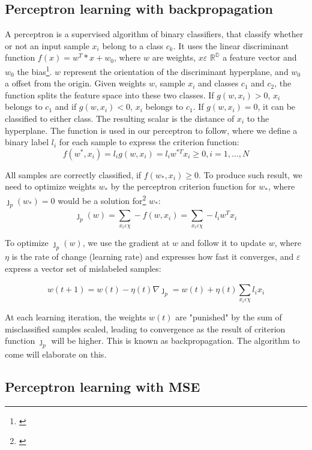 \documentclass[journal]{IEEEtran}
\begin{document}
\subsection{Perceptron learning with backpropagation}

A perceptron is a supervised algorithm of binary classifiers, that classify whether or not an input sample $x_{i}$ belong to a class $c_{k}$. It uses the linear discriminant function $f(x) = w^T*x + w_{0}$, where $w$ are weights, $x\varepsilon$ $\mathbb{R^D}$ a feature vector and $w_{0}$ the bias\footnote{\cite{Iosifidis2017}}. $w$ represent the orientation of the discriminant hyperplane, and $w_{0}$ a offset from the origin. Given weights $w$, sample $x_{i}$ and classes $c_{1}$ and $c_{2}$, the function splits the feature space into these two classes. If $g(w,x_{i}) > 0$, $x_{i}$ belongs to $c_{1}$ and if $g(w,x_{i}) < 0$, $x_{i}$ belongs to $c_{1}$. If $g(w,x_{i}) = 0$, it can be classified to either class. The resulting scalar is the distance of $x_{i}$ to the hyperplane. The function is used in our perceptron to follow, where we define a binary label $l_{i}$ for each sample to express the criterion function: $$ f(w^*,x_{i}) = l_{i} g(w,x_{i}) = l_{i} w^{*T} x_{i} \geq 0, i = 1, ..., N $$

All samples are correctly classified, if $f(w_{*}, x_{i}) \geq 0$. To produce such result, we need to optimize weights $w_{*}$ by the perceptron criterion function for $w_{*}$, where ${\jmath}_{p}(w_{*}) = 0$ would be a solution for\footnote{\cite{Iosifidis2017}} $w_{*}$: $$ {\jmath}_{p}(w) = \sum_{x_{i} \varepsilon \chi}^{} -f(w,x_{i}) = \sum_{x_{i} \varepsilon \chi}^{} -l_{i} w^T x_{i} $$

To optimize ${\jmath}_{p}(w)$, we use the gradient at $w$ and follow it to update $w$, where $\eta$ is the rate of change (learning rate) and expresses how fast it converges, and $\varepsilon$ express a vector set of mislabeled samples:

$$ w(t+1) = w(t) - \eta(t) \nabla{\jmath}_{p} = w(t) + \eta(t) \sum_{x_{i} \varepsilon \chi}^{} l_{i} x_{i} $$

At each learning iteration, the weights $w(t)$ are "punished" by the sum of misclassified samples scaled, leading to convergence as the result of criterion function ${\jmath}_{p}$ will be higher. This is known as backpropagation. The algorithm to come will elaborate on this.

\subsection{Perceptron learning with MSE}
\end{document}
